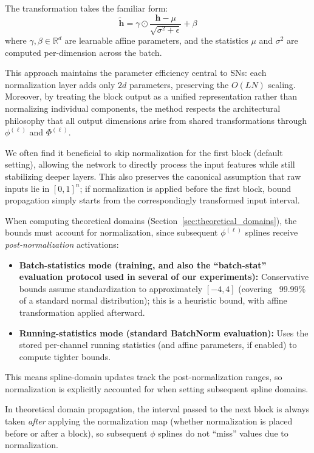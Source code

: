 \documentclass{article}
\theoremstyle{plain}
\theoremstyle{definition}
\theoremstyle{remark}
\begin{document}
The transformation takes the familiar form:
$$\tilde{\mathbf{h}} = \gamma \odot \frac{\mathbf{h} - \mu}{\sqrt{\sigma^2 + \epsilon}} + \beta$$
where $\gamma, \beta \in \mathbb{R}^{d}$ are learnable affine parameters, and the statistics $\mu$ and $\sigma^2$ are computed per-dimension across the batch.

This approach maintains the parameter efficiency central to SNs: each normalization layer adds only $2d$ parameters, preserving the $O(LN)$ scaling. Moreover, by treating the block output as a unified representation rather than normalizing individual components, the method respects the architectural philosophy that all output dimensions arise from shared transformations through $\phi^{(\ell)}$ and $\Phi^{(\ell)}$.

We often find it beneficial to skip normalization for the first block (default setting), allowing the network to directly process the input features while still stabilizing deeper layers. This also preserves the canonical assumption that raw inputs lie in $[0,1]^n$; if normalization is applied before the first block, bound propagation simply starts from the correspondingly transformed input interval.

When computing theoretical domains (Section~\ref{sec:theoretical_domains}), the bounds must account for normalization, since subsequent $\phi^{(\ell)}$ splines receive \emph{post-normalization} activations:
\begin{itemize}
    \item \textbf{Batch-statistics mode (training, and also the ``batch-stat'' evaluation protocol used in several of our experiments):} Conservative bounds assume standardization to approximately $[-4, 4]$ (covering ~99.99\% of a standard normal distribution); this is a heuristic bound, with affine transformation applied afterward.
    \item \textbf{Running-statistics mode (standard BatchNorm evaluation):} Uses the stored per-channel running statistics (and affine parameters, if enabled) to compute tighter bounds.
\end{itemize}
This means spline-domain updates track the post-normalization ranges, so normalization is explicitly accounted for when setting subsequent spline domains.

In theoretical domain propagation, the interval passed to the next block is always taken \emph{after} applying the normalization map (whether normalization is placed before or after a block), so subsequent $\phi$ splines do not ``miss'' values due to normalization.
\end{document}
